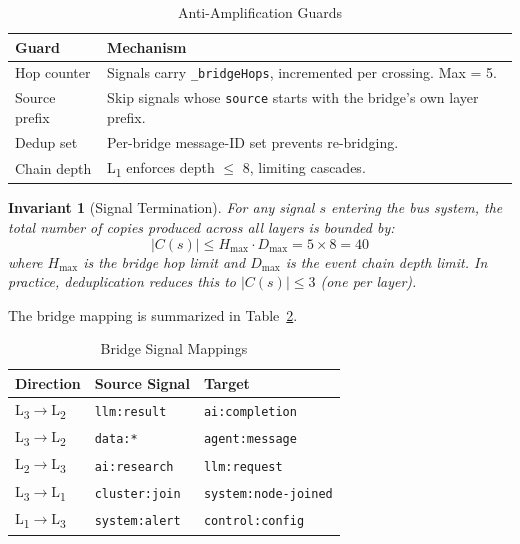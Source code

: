 \documentclass[journal,10pt]{IEEEtran}
\newcommand{\code}[1]{\texttt{#1}}
\newcommand{\layerthree}{L\textsubscript{3}}
\newcommand{\layertwo}{L\textsubscript{2}}
\newcommand{\layerone}{L\textsubscript{1}}
\newtheorem{invariant}{Invariant}
\begin{document}
\begin{table}[!t]
\centering
\caption{Anti-Amplification Guards}
\label{tab:guards}
\begin{tabular}{@{}lp{40mm}@{}}
\toprule
\textbf{Guard} & \textbf{Mechanism} \\
\midrule
Hop counter    & Signals carry \code{\_bridgeHops}, incremented per crossing. Max = 5. \\
Source prefix  & Skip signals whose \code{source} starts with the bridge's own layer prefix. \\
Dedup set      & Per-bridge message-ID set prevents re-bridging. \\
Chain depth    & \layerone{} enforces depth $\leq$ 8, limiting cascades. \\
\bottomrule
\end{tabular}
\end{table}

\begin{invariant}[Signal Termination]
\label{inv:termination}
For any signal $s$ entering the bus system, the total number of copies produced across all layers is bounded by:
\begin{equation}
|C(s)| \leq H_{\max} \cdot D_{\max} = 5 \times 8 = 40
\label{eq:termination}
\end{equation}
where $H_{\max}$ is the bridge hop limit and $D_{\max}$ is the event chain depth limit. In practice, deduplication reduces this to $|C(s)| \leq 3$ (one per layer).
\end{invariant}

The bridge mapping is summarized in Table~\ref{tab:bridgemap}.

\begin{table}[!t]
\centering
\caption{Bridge Signal Mappings}
\label{tab:bridgemap}
\begin{tabular}{@{}lll@{}}
\toprule
\textbf{Direction} & \textbf{Source Signal} & \textbf{Target} \\
\midrule
\layerthree$\to$\layertwo & \code{llm:result}  & \code{ai:completion} \\
\layerthree$\to$\layertwo & \code{data:*}      & \code{agent:message} \\
\layertwo$\to$\layerthree & \code{ai:research} & \code{llm:request} \\
\layerthree$\to$\layerone & \code{cluster:join} & \code{system:node-joined} \\
\layerone$\to$\layerthree & \code{system:alert} & \code{control:config} \\
\bottomrule
\end{tabular}
\end{table}
\end{document}
